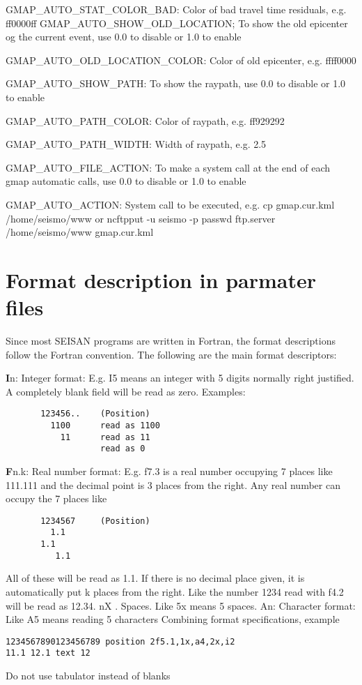GMAP\_AUTO\_STAT\_COLOR\_BAD: Color of bad travel time residuals, e.g. ff0000ff GMAP\_AUTO\_SHOW\_OLD\_LOCATION; To show the old epicenter og the current event, use 0.0 to disable or 1.0 to enable

GMAP\_AUTO\_OLD\_LOCATION\_COLOR: Color of old epicenter, e.g. ffff0000

GMAP\_AUTO\_SHOW\_PATH: To show the raypath, use 0.0 to disable or 1.0 to enable

GMAP\_AUTO\_PATH\_COLOR: Color of raypath, e.g. ff929292

GMAP\_AUTO\_PATH\_WIDTH: Width of raypath, e.g. 2.5

GMAP\_AUTO\_FILE\_ACTION: To make a system call at the end of each gmap automatic calls, use 0.0 to disable or 1.0 to enable

GMAP\_AUTO\_ACTION: System call to be executed, e.g. cp gmap.cur.kml /home/seismo/www or 
 ncftpput -u seismo -p passwd ftp.server /home/seismo/www gmap.cur.kml



\section{Format description in parmater files}

Since most SEISAN programs are written in Fortran, the format descriptions follow the Fortran convention. The following are the main format descriptors: 

\textbf{I}n: Integer format: E.g. I5 means an integer with 5 digits normally right justified. A completely blank field will be read as zero. Examples: 

\begin{verbatim}
       123456..    (Position)
         1100      read as 1100  
           11      read as 11  
                   read as 0  
\end{verbatim}

\textbf{F}n.k: Real number format: E.g. f7.3 is a real number occupying 7 places like 111.111 and the decimal point is 3 places from the right. Any real number can occupy the 7 places like 

\begin{verbatim}
       1234567     (Position)
         1.1 
       1.1 
          1.1
\end{verbatim}

All of these will be read as 1.1. If there is no decimal place given, it is automatically put k places from the right. Like the number 1234 read with f4.2 will be read as 12.34. 
nX . Spaces. Like 5x means 5 spaces.\newline
An: Character format: Like A5 means reading 5 characters\newline
Combining format specifications, example

\begin{verbatim}
1234567890123456789 position 2f5.1,1x,a4,2x,i2
11.1 12.1 text 12 
\end{verbatim}

Do not use tabulator instead of blanks 

%

